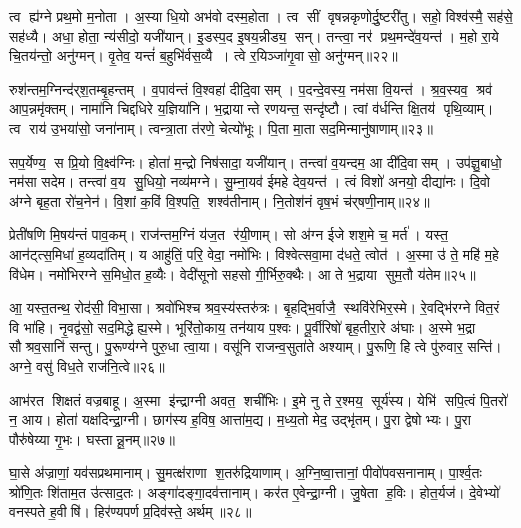 त्व ह्य॑ग्ने प्रथ॒मो म॒नोता।
अ॒स्या धि॒यो अभ॑वो दस्म॒होता।
त्व सीं वृषन्नकृणोर्दु॒ष्टरी॑तु।
सहो॒ विश्व॑स्मै॒ सह॑से॒ सह॑ध्यै।
अधा॒ होता॒ न्य॑सीदो॒ यजी॑यान्।
इ॒डस्प॒द इ॒षय॒न्नीड्य॒ सन्।
तन्त्वा॒ नर॑ प्रथ॒मन्दे॑व॒यन्त॑।
म॒हो रा॒ये चि॒तय॑न्तो॒ अनु॑ग्मन्।
वृ॒तेव॒ यन्तं॑ ब॒हुभि॑र्वस॒व्यै।
त्वे र॒यिञ्जा॑गृ॒वासो॒ अनु॑ग्मन्॥२२॥

रुश॑न्तम॒ग्निन्द॑र्‌श॒तम्बृ॒हन्तम्।
व॒पाव॑न्तं वि॒श्वहा॑ दीदि॒वासम्।
प॒दन्दे॒वस्य॒ नम॑सा वि॒यन्त॑।
श्र॒व॒स्यव॒ श्रव॑ आप॒न्नमृ॑क्तम्।
नामा॑नि चिद्दधिरे य॒ज्ञिया॑नि।
भ॒द्रायान्ते रणयन्त॒ सन्दृ॑ष्टौ।
त्वां व॑र्धन्ति क्षि॒तय॑ पृथि॒व्याम्।
त्व राय॑ उ॒भया॑सो॒ जना॑नाम्।
त्वन्त्रा॒ता त॑रणे॒ चेत्यो॑भूः।
पि॒ता मा॒ता सद॒मिन्मानु॑षाणाम्॥२३॥

सप॒र्येण्य॒ स प्रि॒यो वि॒क्ष्व॑ग्निः।
होता॑ म॒न्द्रो निष॑सादा॒ यजी॑यान्।
तन्त्वा॑ व॒यन्दम॒ आ दी॑दि॒वासम्।
उप॑ज्ञु॒बाधो॒ नम॑सा सदेम।
तन्त्वा॑ व॒य सु॒धियो॒ नव्य॑मग्ने।
सु॒म्ना॒यव॑ ईमहे देव॒यन्त॑।
त्वं विशो॑ अनयो॒ दीद्या॑नः।
दि॒वो अ॑ग्ने बृह॒ता रो॑च॒नेन॑।
वि॒शां क॒विं वि॒श्पति॒ शश्व॑तीनाम्।
नि॒तोश॑नं वृष॒भं च॑र्‌षणी॒नाम्॥२४॥

प्रेती॑षणि मि॒षय॑न्तं पाव॒कम्।
राज॑न्तम॒ग्निं य॑ज॒त र॑यी॒णाम्।
सो अ॑ग्न ईजे शश॒मे च॒ मर्त॑।
यस्त॒ आन॑ट्त्स॒मिधा॑ ह॒व्यदा॑तिम्।
य आहु॑तिं॒ परि॒ वेदा॒ नमो॑भिः।
विश्वेत्सवा॒मा द॑धते॒ त्वोत॑।
अ॒स्मा उ॑ ते॒ महि॑ म॒हे वि॑धेम।
नमो॑भिरग्ने स॒मिधो॒त ह॒व्यैः।
वेदी॑सूनो सहसो गी॒र्भिरु॒क्थैः।
आ ते भ॒द्राया सुम॒तौ य॑तेम॥२५॥

आ॒ यस्त॒तन्थ॒ रोद॑सी॒ विभा॒सा।
श्रवो॑भिश्च श्रव॒स्य॑स्तरु॑त्रः।
बृ॒हद्भि॒र्वाजै॒ स्थवि॑रेभिर॒स्मे।
रे॒वद्भि॑रग्ने वित॒रं वि भा॑हि।
नृ॒वद्व॑सो॒ सद॒मिद्धेह्य॒स्मे।
भूरि॑तो॒काय॒ तन॑याय प॒श्वः।
पू॒र्वीरिषो॑ बृह॒तीरा॒रे अ॑घाः।
अ॒स्मे भ॒द्रा सौश्रव॒सानि॑ सन्तु।
पु॒रूण्य॑ग्ने पुरु॒धा त्वा॒या।
वसू॑नि राजन्व॒सुता॑ते अश्याम्।
पु॒रूणि॒ हि त्वे पु॑रुवार॒ सन्ति॑।
अग्ने॒ वसु॑ विध॒ते राज॑नि॒त्वे॥२६॥\anuvakamend[जा॒गृ॒वासो॒ अनु॑ग्म॒न्मानु॑षाणाञ्चर्‌षणी॒नां य॑तेमाश्या॒न्द्वे च॑]

आभ॑रत शिक्षतं वज्रबाहू।
अ॒स्मा इ॑न्द्राग्नी अवत॒ शची॑भिः।
इ॒मे नु ते र॒श्मय॒ सूर्य॑स्य।
येभि॑ सपि॒त्वं पि॒तरो॑ न॒ आय\sn{}।
होता॑ यक्षदिन्द्रा॒ग्नी।
छाग॑स्य ह॒विष॒ आत्ता॑म॒द्य।
म॒ध्य॒तो मेद॒ उद्भृ॑तम्।
पु॒रा द्वेषोभ्यः।
पु॒रा पौरु॑षेय्या गृ॒भः।
घस्तान्नू॒नम्॥२७॥

घा॒से अ॑ज्राणां॒ यव॑सप्रथमानाम्।
सु॒मत्क्ष॑राणा श॒तरु॑द्रियाणाम्।
अ॒ग्नि॒ष्वा॒त्तानां॒ पीवो॑पवसनानाम्।
पा॒र्श्व॒तः श्रो॑णि॒तः शि॑ताम॒त उ॑त्साद॒तः।
अङ्गा॑दङ्गा॒दव॑त्तानाम्।
कर॑त ए॒वेन्द्रा॒ग्नी।
जु॒षेता ह॒विः।
होत॒र्यज॑।
दे॒वेभ्यो॑ वनस्पते ह॒वीषि॑।
हिर॑ण्यपर्ण प्र॒दिव॑स्ते॒ अर्थम्॥२८॥


